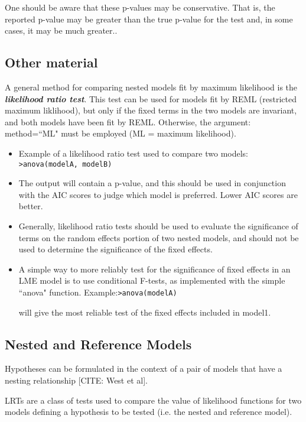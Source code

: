 One should be aware that these p-values may be conservative. That is, the reported p-value may be greater than the true p-value for the test and, in some cases, it may be much greater.\citep[pg.87]{pb}.


\subsection{Other material}
A general method for comparing nested models fit by maximum likelihood is the \textbf{\emph{likelihood ratio test}}. This test can be used for models fit by REML (restricted maximum liklihood), but only if the fixed terms in the two models are invariant, and both models have been fit by REML. Otherwise, the argument: method=``ML" must be employed (ML = maximum likelihood).

\begin{itemize}
\item Example of a likelihood ratio test used to compare two models: \newline \texttt{>anova(modelA, modelB)}

\item The output will contain a p-value, and this should be used in conjunction with the AIC scores to judge which model is preferred. Lower AIC scores are better.

\item Generally, likelihood ratio tests should be used to evaluate the significance of terms on the
random effects portion of two nested models, and should not be used to determine the significance of the fixed effects.
\item A simple way to more reliably test for the significance of fixed effects in an LME model is to use
conditional F-tests, as implemented with the simple ``anova" function.
Example:\newline \texttt{>anova(modelA)}


will give the most reliable test of the fixed effects included in model1.
\end{itemize}
\subsection{Nested and Reference Models}
Hypotheses can be formulated in the context of a pair of models that have a nesting relationship [CITE: West et al].

LRTs are a class of tests used to compare the value of likelihood functions for two models defining a hypothesis to be tested (i.e. the nested and reference model).

